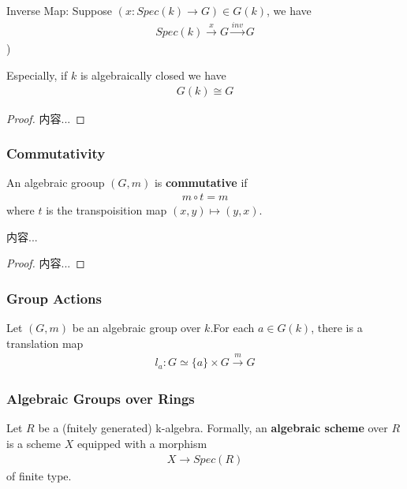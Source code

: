 \documentclass[Total.tex]{subfiles}
\begin{document}
\begin{example}
				 Inverse Map: Suppose $(x:Spec(k)\rightarrow G)\in G(k)$, we have
				 \begin{gather*}
				 	Spec(k)\stackrel{x}{\rightarrow} G\stackrel{inv}{\rightarrow} G
				 \end{gather*})
				
				\begin{proposition}
					Especially, if $k$ is algebraically closed we have
					\begin{gather*}
						G(k)\cong G
					\end{gather*}
				\end{proposition}
				\begin{proof}
					内容...
				\end{proof}
			\subsubsection{Commutativity}
				\begin{Def}
					An algebraic grooup $(G,m)$ is \textbf{commutative} if 
					\begin{gather*}
						m\circ t=m
					\end{gather*}
					where $t$ is the transpoisition map $(x,y)\mapsto (y,x)$.
				\end{Def}
				\begin{propoosition}
					内容...
				\end{propoosition}
				\begin{proof}
					内容...
				\end{proof}
			\subsubsection{Group Actions}
				\begin{Def}
					Let $(G,m)$ be an algebraic group over $k$.For each $a\in G(k)$, there is a translation map
					\begin{gather*}
						l_a:G\simeq \{a\}\times G\stackrel{m}{\rightarrow} G
					\end{gather*}
				\end{Def}
			\subsubsection{Algebraic Groups over Rings}
				\begin{Def}
					Let $R$ be a (fnitely generated) k-algebra. Formally, an \textbf{algebraic scheme} over $R$ is a scheme $X$ equipped with a morphism
					\begin{gather*}
						X\rightarrow Spec(R)
					\end{gather*}
					of finite type.
					

\end{Def}
\end{example}
\end{document}

